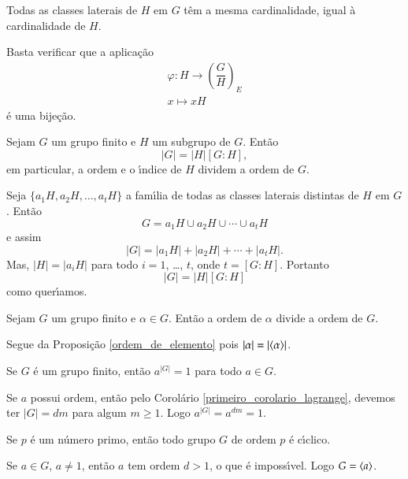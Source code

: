 \begin{proposicao}
	Todas as classes laterais de $H$ em $G$ t\^em a mesma cardinalidade, igual \`a cardinalidade de $H$.
\end{proposicao}
\begin{prova}
	Basta verificar que a aplica\c{c}\~ao
	\begin{align*}
		\varphi : H \to \left(\dfrac{G}{H}\right)_E\\
		x \mapsto xH
	\end{align*}
	\'e uma bije\c{c}\~ao.
\end{prova}

\begin{teorema}\label{teorema_de_lagrange}
	Sejam $G$ um grupo finito e $H$ um subgrupo de $G$. Ent\~ao
	\[
		|G| = |H|[G:H],
	\]
	em particular, a ordem e o {\'\i}ndice de $H$ dividem a ordem de $G$.
\end{teorema}
\begin{prova}
	Seja $\{a_1H, a_2H, \dots, a_tH\}$ a fam{\'\i}lia de todas as classes laterais distintas de $H$ em $G$. Ent\~ao
	\[
		G = a_1H \cup a_2H \cup \cdots \cup a_tH
	\]
	e assim
	\[
		|G| = |a_1H| + |a_2H| + \cdots + |a_tH|.
	\]
	Mas, $|H| = |a_iH|$ para todo $i = 1$, \dots, $t$, onde $t = [G:H]$. Portanto
	\[
		|G| = |H|[G:H]
	\]
	como quer{\'\i}amos.
\end{prova}

\begin{corolario}\label{primeiro_corolario_lagrange}
	Sejam $G$ um grupo finito e $\alpha \in G$. Ent\~ao a ordem de $\alpha$ divide a ordem de $G$.
\end{corolario}
\begin{prova}
	Segue da Proposi\c{c}\~ao \ref{ordem_de_elemento} pois $|\alpha| = |\langle{\alpha}\rangle|$.
\end{prova}

\begin{corolario}
	Se $G$ \'e um grupo finito, ent\~ao $a^{|G|} = 1$ para todo $a \in G$.
\end{corolario}
\begin{prova}
	Se $a$ possui ordem, ent\~ao pelo Corol\'ario \ref{primeiro_corolario_lagrange}, devemos ter $|G| = dm$ para algum $m \ge 1$. Logo $a^{|G|} = a^{dm} = 1$.
\end{prova}

\begin{corolario}
	Se $p$ \'e um n\'umero primo, ent\~ao todo grupo $G$ de ordem $p$ \'e c{\'\i}clico.
\end{corolario}
\begin{prova}
	Se $a \in G$, $a \ne 1$, ent\~ao $a$ tem ordem $d > 1$, o que \'e imposs{\'\i}vel. Logo $G = \langle{a}\rangle$.
\end{prova}

